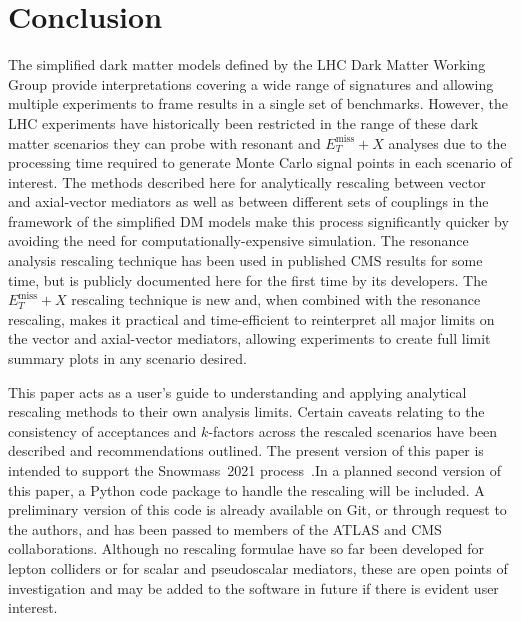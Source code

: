 \documentclass[a4paper, 11pt]{article}
\newcommand{\MET}{\ensuremath{E_T^\mathrm{miss}}\xspace}
\newcommand{\metplusx}{\ensuremath{\MET+X}\xspace}
\begin{document}
\section{Conclusion}

The simplified dark matter models defined by the LHC Dark Matter Working Group provide interpretations covering a wide range of signatures and allowing multiple experiments to frame results in a single set of benchmarks.
However, the LHC experiments have historically been restricted in the range of these dark matter scenarios they can probe with resonant and \metplusx analyses due to the processing time required to generate Monte Carlo signal points in each scenario of interest. The methods described here for analytically rescaling between vector and axial-vector mediators as well as between different sets of couplings in the framework of the simplified DM models make this process significantly quicker by avoiding the need for computationally-expensive simulation.  The resonance analysis rescaling technique has been used in published CMS results for some time, but is publicly documented here for the first time by its developers. The \metplusx rescaling technique is new and, when combined with the resonance rescaling, makes it practical and time-efficient to reinterpret all major limits on the vector and axial-vector mediators, allowing experiments to create full limit summary plots in any scenario desired.

This paper acts as a user's guide to understanding and applying analytical rescaling methods to their own analysis limits. Certain caveats relating to the consistency of acceptances and $k$-factors across the rescaled scenarios have been described and recommendations outlined. The present version of this paper is intended to support the Snowmass~2021 process~\cite{snowmass21}.In a planned second version of this paper, a Python code package to handle the rescaling will be included. A preliminary version of this code is already available on Git, or through request to the authors, and has been passed to members of the ATLAS and CMS collaborations.
Although no rescaling formulae have so far been developed for lepton colliders or for scalar and pseudoscalar mediators, these are open points of investigation and may be added to the software in future if there is evident user interest.
\end{document}
